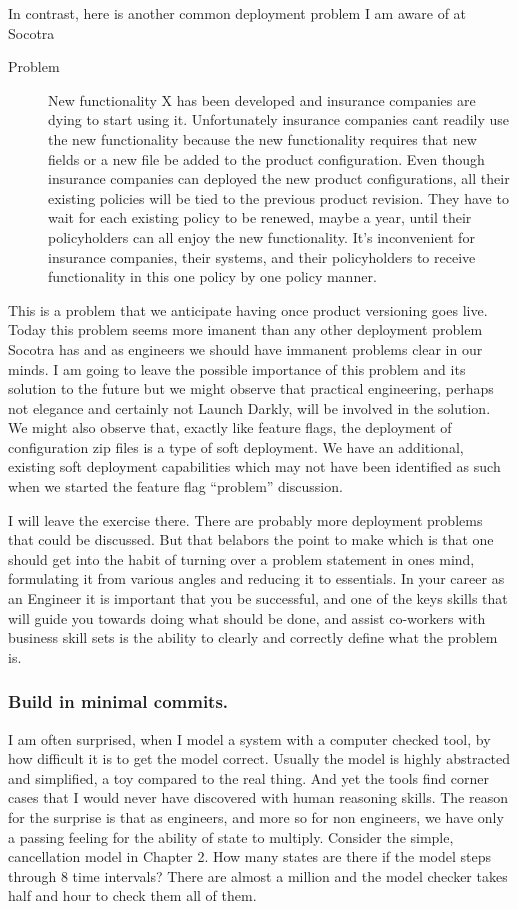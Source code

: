In contrast, here is another common deployment problem I am aware of at Socotra
\begin{description}
  \item[Problem] New functionality X has been developed and insurance companies are dying to start using it. Unfortunately insurance companies
  cant readily use the new functionality because the new functionality requires that new fields or a new file be added to the product configuration. Even
  though insurance companies can deployed the new product configurations, all their existing policies will be tied to the previous product revision. They have to wait for each
  existing policy to be renewed, maybe a year, until their policyholders can all enjoy the new functionality. It's inconvenient for insurance
  companies, their systems, and their policyholders to receive functionality in this one policy by one policy  manner.
\end{description}
This is a problem that we anticipate having once product versioning goes live. Today this problem seems more imanent than any other deployment problem Socotra
has and as engineers we should have immanent problems clear in our minds. I am going to leave the possible importance of this problem and its solution to the future
but we might observe that practical engineering, perhaps not elegance and certainly not Launch Darkly, will be involved in the solution. We might also observe
that, exactly like feature flags, the deployment of configuration zip files is a type of soft deployment. We have an additional, existing soft deployment
capabilities which may not have been identified as such when we started the feature flag ``problem'' discussion.

I will leave the exercise there. There are probably more deployment problems that could be discussed. But that belabors the point to make
which is that
one should get into the habit of turning over a problem statement in ones mind, formulating it from various angles and reducing it to
essentials. In your career as an Engineer it is important that you be successful, and one of the keys skills that will guide you towards doing what should
be done, and assist co-workers with business skill sets is the ability to clearly and correctly define what the problem is.


\subsubsection{Build in minimal commits.}
I am often surprised, when I model a system with a computer checked tool, by how difficult it is to get the model correct. Usually the model
is highly abstracted and simplified, a toy compared to the real thing. And yet the tools find corner cases that I would never have discovered with
human reasoning skills. The reason for the surprise is that as engineers, and more so for non engineers, we have only a passing feeling for the
ability of state to multiply. Consider the simple, cancellation model in Chapter 2. How many states are there if the model steps through 8 time intervals?
There are almost a million and the model checker takes half and hour to check them all of them.

